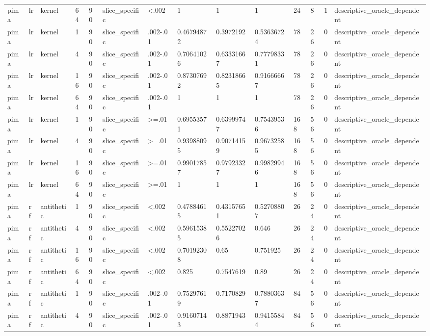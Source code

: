 \begin{tabular}{llllllllllllll}
pima & lr & kernel & 64 & 90 & slice\_specific & <.002 & 1 & 1 & 1 & 24 & 8 & 1 & descriptive\_oracle\_dependent \\
pima & lr & kernel & 1 & 90 & slice\_specific & .002-.01 & 0.46794872 & 0.3972192 & 0.53636724 & 78 & 26 & 0 & descriptive\_oracle\_dependent \\
pima & lr & kernel & 4 & 90 & slice\_specific & .002-.01 & 0.70641026 & 0.63331667 & 0.77798331 & 78 & 26 & 0 & descriptive\_oracle\_dependent \\
pima & lr & kernel & 16 & 90 & slice\_specific & .002-.01 & 0.87307692 & 0.82318665 & 0.91666667 & 78 & 26 & 0 & descriptive\_oracle\_dependent \\
pima & lr & kernel & 64 & 90 & slice\_specific & .002-.01 & 1 & 1 & 1 & 78 & 26 & 0 & descriptive\_oracle\_dependent \\
pima & lr & kernel & 1 & 90 & slice\_specific & >=.01 & 0.69553571 & 0.63999747 & 0.75439536 & 168 & 56 & 0 & descriptive\_oracle\_dependent \\
pima & lr & kernel & 4 & 90 & slice\_specific & >=.01 & 0.93988095 & 0.90714159 & 0.96732585 & 168 & 56 & 0 & descriptive\_oracle\_dependent \\
pima & lr & kernel & 16 & 90 & slice\_specific & >=.01 & 0.99017857 & 0.97923327 & 0.99829946 & 168 & 56 & 0 & descriptive\_oracle\_dependent \\
pima & lr & kernel & 64 & 90 & slice\_specific & >=.01 & 1 & 1 & 1 & 168 & 56 & 0 & descriptive\_oracle\_dependent \\
pima & rf & antithetic & 1 & 90 & slice\_specific & <.002 & 0.47884615 & 0.43157651 & 0.52708807 & 26 & 24 & 0 & descriptive\_oracle\_dependent \\
pima & rf & antithetic & 4 & 90 & slice\_specific & <.002 & 0.59615385 & 0.55227026 & 0.646 & 26 & 24 & 0 & descriptive\_oracle\_dependent \\
pima & rf & antithetic & 16 & 90 & slice\_specific & <.002 & 0.70192308 & 0.65 & 0.751925 & 26 & 24 & 0 & descriptive\_oracle\_dependent \\
pima & rf & antithetic & 64 & 90 & slice\_specific & <.002 & 0.825 & 0.7547619 & 0.89 & 26 & 24 & 0 & descriptive\_oracle\_dependent \\
pima & rf & antithetic & 1 & 90 & slice\_specific & .002-.01 & 0.75297619 & 0.7170829 & 0.78803637 & 84 & 56 & 0 & descriptive\_oracle\_dependent \\
pima & rf & antithetic & 4 & 90 & slice\_specific & .002-.01 & 0.91607143 & 0.8871943 & 0.94155844 & 84 & 56 & 0 & descriptive\_oracle\_dependent \\

\end{tabular}
